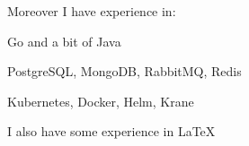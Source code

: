 Moreover I have experience in:
\begin{bulist}
  \item Go and a bit of Java
  \item PostgreSQL, MongoDB, RabbitMQ, Redis
  \item Kubernetes, Docker, Helm, Krane
\end{bulist}
I also have some experience in \LaTeX
